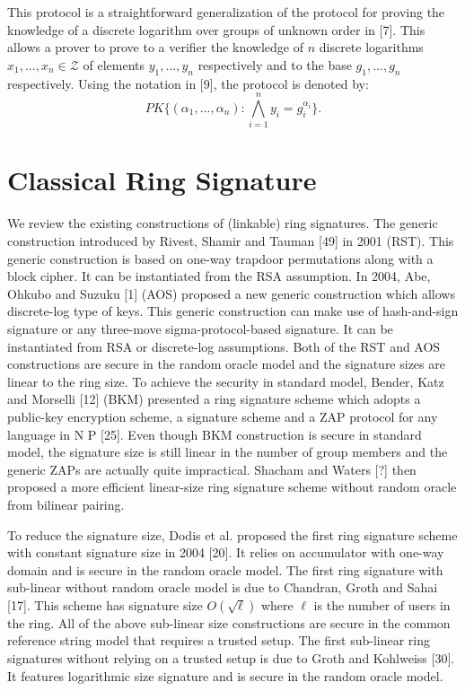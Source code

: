 \documentclass[11pt]{article}
\begin{document}
This protocol is a straightforward generalization of the protocol for proving the knowledge of a discrete logarithm over groups of unknown order in [7].
This allows a prover to prove to a verifier the knowledge of $n$ discrete logarithms $x_1,...,x_n \in \mathcal{Z}$ of elements $y_1,...,y_n$ respectively and to the base $g_1,...,g_n$ respectively. Using the notation in [9], the protocol is denoted by:
\begin{equation}
PK\{(\alpha_1,...,\alpha_n) : \bigwedge_{i=1}^{n}{y_i = g_i^{\alpha_i}} \}.
\end{equation}


\section{Classical Ring Signature}
We review the existing constructions of (linkable) ring
signatures. The generic construction introduced by Rivest, Shamir and Tauman [49] in 2001 (RST). This generic construction is based on one-way trapdoor
permutations along with a block cipher. It can be instantiated from the RSA assumption. In 2004, Abe, Ohkubo and Suzuku [1] (AOS) proposed a new generic
construction which allows discrete-log type of keys. This generic construction can
make use of hash-and-sign signature or any three-move sigma-protocol-based signature. It can be instantiated from RSA or discrete-log assumptions. Both of the
RST and AOS constructions are secure in the random oracle model and the signature sizes are linear to the ring size. To achieve the security in standard model,
Bender, Katz and Morselli [12] (BKM) presented a ring signature scheme which
adopts a public-key encryption scheme, a signature scheme and a ZAP protocol
for any language in N P [25]. Even though BKM construction is secure in standard model, the signature size is still linear in the number of group members
and the generic ZAPs are actually quite impractical. Shacham and Waters [?]
then proposed a more efficient linear-size ring signature scheme without random
oracle from bilinear pairing.

To reduce the signature size, Dodis et al. proposed the first ring signature
scheme with constant signature size in 2004 [20]. It relies on accumulator with
one-way domain and is secure in the random oracle model. The first ring signature with sub-linear without random oracle model is due to Chandran, Groth and Sahai [17]. This scheme has signature size $O(\sqrt{\ell})$ where $\ell$ is the number of users in the ring. All of the above sub-linear size constructions are secure in the common reference string model that requires a trusted setup. The first sub-linear ring signatures without relying on a trusted setup is due to Groth and Kohlweiss [30]. It features logarithmic size signature and is secure in the random oracle model.
\end{document}
